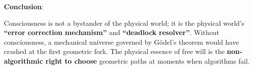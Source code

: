 \textbf{Conclusion}:

Consciousness is not a bystander of the physical world; it is the physical world's \textbf{``error correction mechanism''} and \textbf{``deadlock resolver''}. Without consciousness, a mechanical universe governed by G\"{o}del's theorem would have crashed at the first geometric fork. The physical essence of free will is the \textbf{non-algorithmic right to choose} geometric paths at moments when algorithms fail.
